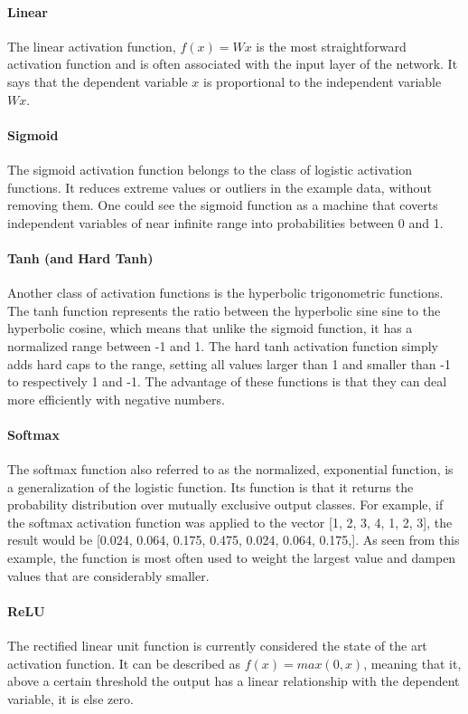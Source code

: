 \paragraph{Linear}
The linear activation function, $f(x) = Wx$ is the most straightforward activation function and is often associated with the input layer of the network. It says that the dependent variable $x$ is proportional to the independent variable $Wx$.

\paragraph{Sigmoid}
The sigmoid activation function belongs to the class of logistic activation functions. It reduces extreme values or outliers in the example data, without removing them. One could see the sigmoid function as a machine that coverts independent variables of near infinite range into probabilities between 0 and 1.

\paragraph{Tanh (and Hard Tanh)}
Another class of activation functions is the hyperbolic trigonometric functions. The tanh function represents the ratio between the hyperbolic sine sine to the hyperbolic cosine, which means that unlike the sigmoid function, it has a normalized range between -1 and 1. The hard tanh activation function simply adds hard caps to the range, setting all values larger than 1 and smaller than -1 to respectively 1 and -1. The advantage of these functions is that they can deal more efficiently with negative numbers.

\paragraph{Softmax}
The softmax function also referred to as the normalized, exponential function, is a generalization of the logistic function. Its function is that it returns the probability distribution over mutually exclusive output classes. For example, if the softmax activation function was applied to the vector [1, 2, 3, 4, 1, 2, 3], the result would be [0.024, 0.064, 0.175, 0.475, 0.024, 0.064, 0.175,]. As seen from this example, the function is most often used to weight the largest value and dampen values that are considerably smaller. 

\paragraph{ReLU}
The rectified linear unit function is currently considered the state of the art activation function. It can be described as $f(x)=max(0,x)$, meaning that it, above a certain threshold the output has a linear relationship with the dependent variable, it is else zero.

